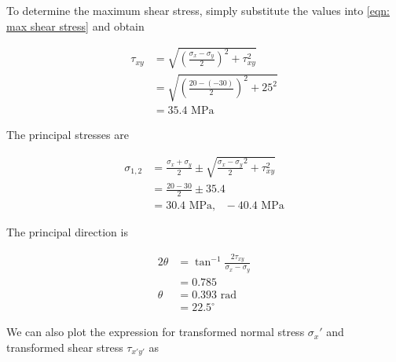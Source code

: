 \documentclass[
10pt,
a4paper,
openany,
svgnames,
]{book}
\begin{document}
\begin{solution}
  To determine the maximum shear stress, simply substitute the values into \cref{eqn: max shear stress} and obtain
  
  \[\begin{aligned}
      \tau_{xy} &= \sqrt {\left( \frac{\sigma_x - \sigma_y}{2} \right)^2 + \tau _{xy}^2}  \\ 
      &= \sqrt {\left( \frac{20 - ( - 30)}{2} \right)^2 + 25^2}  \\ 
      &= 35.4\text{ MPa}
    \end{aligned} \]
  
  The principal stresses are

  \[\begin{aligned}
      \sigma_{1,2} &= \frac{\sigma_x + \sigma_y}{2} \pm \sqrt {\frac{\sigma_x - \sigma_y}{2}^2 + \tau _{xy}^2}  \\ 
      &= \frac{20 - 30}{2} \pm 35.4 \\ 
      &= 30.4\text{ MPa}, \text{ } - 40.4\text{ MPa}
    \end{aligned} \]
  
  The principal direction is
  
  \[\begin{aligned}
      2\theta & = \tan^{-1}\frac{2\tau_{xy}}{\sigma_x - \sigma_y} \\ 
      &= 0.785 \\ 
      \theta  &= 0.393\text{ rad} \\ 
      &= 22.5^{\circ}
    \end{aligned} \]

  We can also plot the expression for transformed normal stress $\sigma_x'$ and transformed shear stress $\tau_{x'y'}$ as

  \begin{figure}[H]
    \centering
  \end{figure}


\end{solution}
\end{document}
